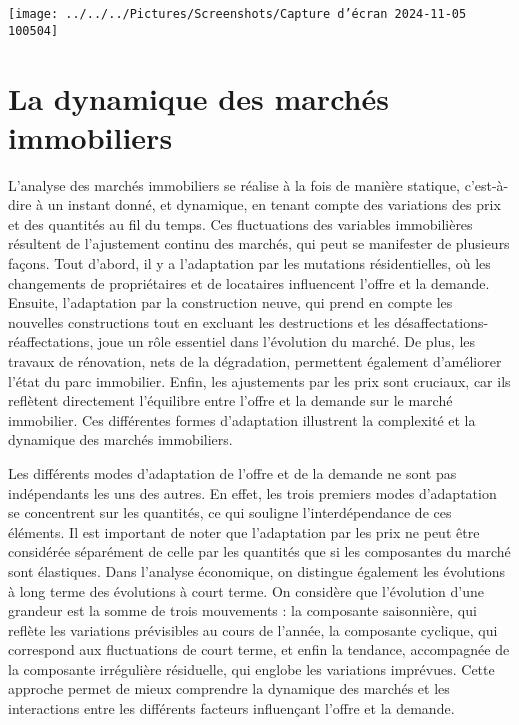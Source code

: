 \documentclass[a4paper, 12pt]{report}
\begin{document}
\begin{center}
	\texttt{[image: ../../../Pictures/Screenshots/Capture d'écran 2024-11-05 100504]}
\end{center}



\chapter{La dynamique des marchés immobiliers}

L'analyse des marchés immobiliers se réalise à la fois de manière statique, c'est-à-dire à un instant donné, et dynamique, en tenant compte des variations des prix et des quantités au fil du temps. Ces fluctuations des variables immobilières résultent de l'ajustement continu des marchés, qui peut se manifester de plusieurs façons. Tout d'abord, il y a l'adaptation par les mutations résidentielles, où les changements de propriétaires et de locataires influencent l'offre et la demande. Ensuite, l'adaptation par la construction neuve, qui prend en compte les nouvelles constructions tout en excluant les destructions et les désaffectations-réaffectations, joue un rôle essentiel dans l'évolution du marché. De plus, les travaux de rénovation, nets de la dégradation, permettent également d'améliorer l'état du parc immobilier. Enfin, les ajustements par les prix sont cruciaux, car ils reflètent directement l'équilibre entre l'offre et la demande sur le marché immobilier. Ces différentes formes d'adaptation illustrent la complexité et la dynamique des marchés immobiliers.

Les différents modes d'adaptation de l'offre et de la demande ne sont pas indépendants les uns des autres. En effet, les trois premiers modes d'adaptation se concentrent sur les quantités, ce qui souligne l'interdépendance de ces éléments. Il est important de noter que l'adaptation par les prix ne peut être considérée séparément de celle par les quantités que si les composantes du marché sont élastiques. Dans l'analyse économique, on distingue également les évolutions à long terme des évolutions à court terme. On considère que l'évolution d'une grandeur est la somme de trois mouvements : la composante saisonnière, qui reflète les variations prévisibles au cours de l'année, la composante cyclique, qui correspond aux fluctuations de court terme, et enfin la tendance, accompagnée de la composante irrégulière résiduelle, qui englobe les variations imprévues. Cette approche permet de mieux comprendre la dynamique des marchés et les interactions entre les différents facteurs influençant l'offre et la demande.
\end{document}
